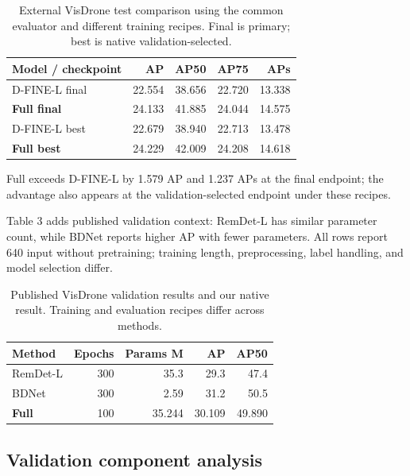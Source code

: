 \begin{table}[t]
\caption{External VisDrone test comparison using the common evaluator and different training recipes. Final is primary; best is native validation-selected.}
\label{tab:2}
\centering\tablefont
\begin{tabular*}{\columnwidth}{@{\extracolsep{\fill}}lrrrr@{}}
\toprule
\textbf{Model / checkpoint} & \textbf{AP} & \textbf{AP50} & \textbf{AP75} & \textbf{APs} \\
\midrule
D-FINE-L final & 22.554 & 38.656 & 22.720 & 13.338 \\
\textbf{Full final} & 24.133 & 41.885 & 24.044 & 14.575 \\
\midrule
D-FINE-L best & 22.679 & 38.940 & 22.713 & 13.478 \\
\textbf{Full best} & 24.229 & 42.009 & 24.208 & 14.618 \\
\bottomrule
\end{tabular*}
\end{table}

Full exceeds D-FINE-L by 1.579 AP and 1.237 APs at the final endpoint; the advantage also appears at the validation-selected endpoint under these recipes.


Table 3 adds published validation context: RemDet-L \cite{li2025remdet} has similar parameter count, while BDNet \cite{guan2026bdnet} reports higher AP with fewer parameters. All rows report 640 input without pretraining; training length, preprocessing, label handling, and model selection differ.


\begin{table}[t]
\caption{Published VisDrone validation results and our native result. Training and evaluation recipes differ across methods.}
\label{tab:3}
\centering\tablefont
\begin{tabular*}{\columnwidth}{@{\extracolsep{\fill}}lrrrr@{}}
\toprule
\textbf{Method} & \textbf{Epochs} & \textbf{Params M} & \textbf{AP} & \textbf{AP50} \\
\midrule
RemDet-L \cite{li2025remdet} & 300 & 35.3 & 29.3 & 47.4 \\
BDNet \cite{guan2026bdnet} & 300 & 2.59 & 31.2 & 50.5 \\
\textbf{Full} & 100 & 35.244 & 30.109 & 49.890 \\
\bottomrule
\end{tabular*}
\end{table}

\subsection{Validation component analysis}

